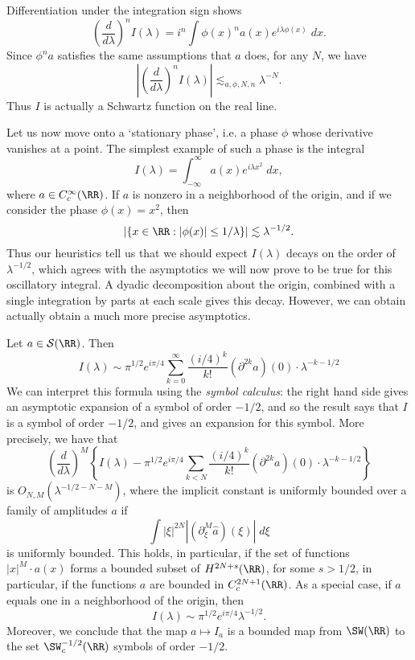 \begin{remark}
    Differentiation under the integration sign shows
    \[ \left( \frac{d}{d\lambda} \right)^n I (\lambda) = i^n \int \phi(x)^n a(x) e^{i \lambda \phi(x)}\; dx. \]
    Since $\phi^n a$ satisfies the same assumptions that $a$ does, for any $N$, we have
    \[ \left| \left( \frac{d}{d\lambda} \right)^n I (\lambda) \right| \lesssim_{a,\phi,N,n} \lambda^{-N}. \]
    Thus $I$ is actually a Schwartz function on the real line. %
\end{remark}

Let us now move onto a `stationary phase', i.e. a phase $\phi$ whose derivative vanishes at a point. The simplest example of such a phase is the integral
%
\[ I(\lambda) = \int_{-\infty}^\infty a(x) e^{i \lambda x^2}\; dx, \]
%
where $a \in C_c^\infty(\RR)$. If $a$ is nonzero in a neighborhood of the origin, and if we consider the phase $\phi(x) = x^2$, then
%
\[ |\{ x \in \RR : |\phi(x)| \leq 1/\lambda \}| \lesssim \lambda^{-1/2}. \]
%
Thus our heuristics tell us that we should expect $I(\lambda)$ decays on the order of $\lambda^{-1/2}$, which agrees with the asymptotics we will now prove to be true for this oscillatory integral. A dyadic decomposition about the origin, combined with a single integration by parts at each scale gives this decay. However, we can obtain actually obtain a much more precise asymptotics.

\begin{theorem}
  Let $a \in \mathcal{S}(\RR)$. Then
  \[ I(\lambda) \sim \pi^{1/2} e^{i \pi / 4} \sum_{k = 0}^\infty \frac{(i/4)^k}{k!} (\partial^{2k} a)(0) \cdot \lambda^{-k-1/2} \]
  We can interpret this formula using the \emph{symbol calculus}: the right hand side gives an asymptotic expansion of a symbol of order $-1/2$, and so the result says that $I$ is a symbol of order $-1/2$, and gives an expansion for this symbol. More precisely, we have that
  \[ \left( \frac{d}{d\lambda} \right)^M \left\{ I(\lambda) - \pi^{1/2} e^{i \pi / 4} \sum_{k < N} \frac{(i/4)^k}{k!} (\partial^{2k} a)(0) \cdot \lambda^{-k-1/2} \right\} \]
  is $O_{N,M}(\lambda^{-1/2-N-M})$, where the implicit constant is uniformly bounded over a family of amplitudes $a$ if
  \[ \int |\xi|^{2N} |(\partial_\xi^M \widehat{a})(\xi)|\; d\xi \]
  is uniformly bounded. This holds, in particular, if the set of functions $|x|^M \cdot a(x)$ forms a bounded subset of $H^{2N+s}(\RR)$, for some $s > 1/2$, in particular, if the functions $a$ are bounded in $C_c^{2N+1}(\RR)$. As a special case, if $a$ equals one in a neighborhood of the origin, then
  \[ I(\lambda) \sim \pi^{1/2} e^{i \pi / 4} \lambda^{-1/2}. \]
  Moreover, we conclude that the map $a \mapsto I_a$ is a bounded map from $\SW(\RR)$ to the set $\SW^{-1/2}_c(\RR)$ symbols of order $-1/2$.
\end{theorem}

